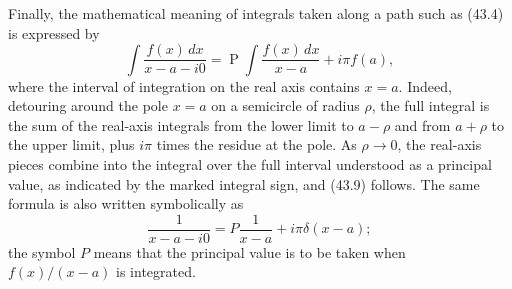 Finally, the mathematical meaning of integrals taken along a path such as
(43.4) is expressed by
\begin{equation}
  \int\frac{f(x)\,dx}{x-a-i0}
  =\operatorname{P}\!\int\frac{f(x)\,dx}{x-a}+i\pi f(a),
  \tag{43.9}
\end{equation}
where the interval of integration on the real axis contains $x=a$. Indeed,
detouring around the pole $x=a$ on a semicircle of radius $\rho$, the full
integral is the sum of the real-axis integrals from the lower limit to
$a-\rho$ and from $a+\rho$ to the upper limit, plus $i\pi$ times the residue
at the pole. As $\rho\to0$, the real-axis pieces combine into the integral
over the full interval understood as a principal value, as indicated by the
marked integral sign, and (43.9) follows. The same formula is also written
symbolically as
\begin{equation}
  \frac1{x-a-i0}=P\frac1{x-a}+i\pi\delta(x-a);
  \tag{43.10}
\end{equation}
the symbol $P$ means that the principal value is to be taken when
$f(x)/(x-a)$ is integrated.
